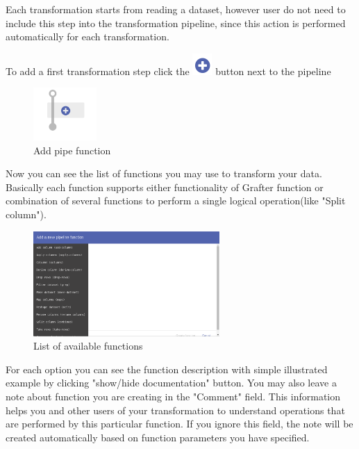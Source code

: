 \documentclass[USenglish]{article}
\begin{document}
Each transformation starts from reading a dataset, however user do not need to include this step into the transformation pipeline, since this action is performed automatically for each transformation.

To add a first transformation step click the {\includegraphics[scale=0.8]{add.png}} button next to the pipeline
\begin{center}
\begin{figure}[!htbp]
\centering
\includegraphics[height=2cm] {addpipefunction.png}
 \caption{Add pipe function \label{meta}}
\end{figure}
\end{center}

Now you can see the list of functions you may use to transform your data. Basically each function supports either functionality of Grafter function or combination of several functions to perform a single logical operation(like "Split column").
\begin{center}
\begin{figure}[!htbp]
\centering
\includegraphics[height=4cm] {functionlist.png}
 \caption{List of available functions \label{meta}}
\end{figure}
\end{center}

 For each option you can see the function description with simple illustrated example by clicking "show/hide documentation" button. You may also leave a note about function you are creating in the "Comment" field. This information helps you and other users of your transformation to understand operations that are performed by this particular function. If you ignore this field, the note will be created automatically based on function parameters you have specified.
 
\end{document}
